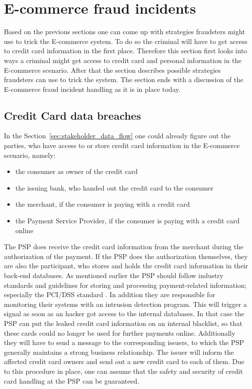 
\section{\gls{E-commerce} fraud incidents}
\label{sec:scenario_fraud}

Based on the previous sections one can come up with strategies fraudsters might use to trick the \gls{E-commerce} system. To do so the criminal will have to get access to credit card information in the first place. Therefore this section first looks into ways a criminal might get access to credit card and personal information in the \gls{E-commerce} scenario. After that the section describes possible strategies fraudsters can use to trick the system. The section ends with a discussion of the \gls{E-commerce} fraud incident handling as it is in place today.

\subsection{Credit Card data breaches}
\label{subsec:leaking_credit_cards}

 In the Section~\ref{sec:stakeholder_data_flow} one could already figure out the parties, who have access to or store credit card information in the \gls{E-commerce} scenario, namely:\@

\begin{itemize}
  \item the consumer as owner of the credit card
  \item the issuing bank, who handed out the credit card to the consumer
  \item the merchant, if the consumer is paying with a credit card
  \item the Payment Service Provider, if the consumer is paying with a credit card online
\end{itemize}

The \gls{PSP} does receive the credit card information from the merchant during the authorization of the payment. If the \gls{PSP} does the authorization themselves, they are also the participant, who stores and holds the credit card information in their back-end databases. As mentioned earlier the \gls{PSP} should follow industry standards and guidelines for storing and processing payment-related information; especially the \gls{PCI/DSS} standard \citep{virtue2009payment}. In addition they are responsible for monitoring their systems with an intrusion detection program. This will trigger a signal as soon as an hacker got access to the internal databases. In that case the \gls{PSP} can put the leaked credit card information on an internal blacklist, so that these cards could no longer be used for further payments online. Additionally they will have to send a message to the corresponding issuers, to which the \gls{PSP} generally maintains a strong business relationship. The issuer will inform the affected credit card owners and send out a new credit card to each of them. Due to this procedure in place, one can assume that the safety and security of credit card handling at the \gls{PSP} can be guaranteed. \\

